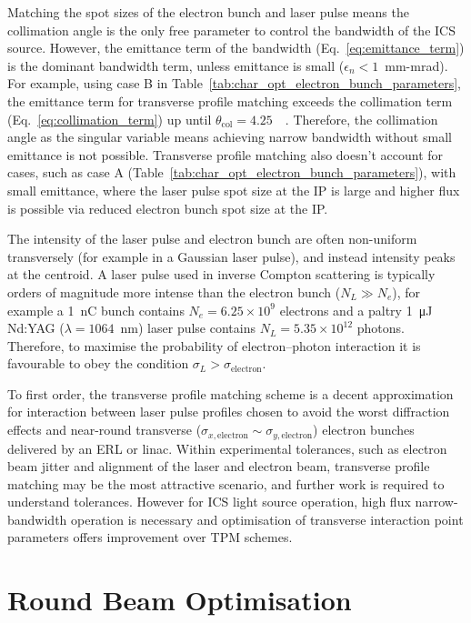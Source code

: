 \documentclass[../main.tex]{subfiles}
\begin{document}
Matching the spot sizes of the electron bunch and laser pulse means the collimation angle is the only free parameter to control the bandwidth of the ICS source. However, the emittance term of the bandwidth (Eq.~\ref{eq:emittance_term}) is the dominant bandwidth term, unless emittance is small ($\epsilon_{n} < 1$~\si{\milli\meter}-\si{\milli\radian}). For example, using case B in Table~\ref{tab:char_opt_electron_bunch_parameters}, the emittance term for transverse profile matching exceeds the collimation term (Eq.~\ref{eq:collimation_term}) up until $\theta_{\mathrm{col}} = 4.25$~\si{\milli\rad}. Therefore, the collimation angle as the singular variable means achieving narrow bandwidth without small emittance is not possible. Transverse profile matching also doesn't account for cases, such as case A (Table~\ref{tab:char_opt_electron_bunch_parameters}), with small emittance, where the laser pulse spot size at the IP is large and higher flux is possible via reduced electron bunch spot size at the IP. 

The intensity of the laser pulse and electron bunch are often non-uniform transversely (for example in a Gaussian laser pulse), and instead intensity peaks at the centroid. A laser pulse used in inverse Compton scattering is typically orders of magnitude more intense than the electron bunch ($N_{L} \gg N_{e}$), for example a 1~\si{\nano\coulomb} bunch contains $N_{e} = 6.25\times 10^{9}$ electrons and a paltry 1~\si{\micro\joule} Nd:YAG ($\lambda = 1064$~\si{\nano\meter}) laser pulse contains $N_{L} = 5.35\times 10^{12}$ photons. Therefore, to maximise the probability of electron--photon interaction it is favourable to obey the condition $\sigma_{L} > \sigma_{\mathrm{electron}}$.

To first order, the transverse profile matching scheme is a decent approximation for interaction between laser pulse profiles chosen to avoid the worst diffraction effects and near-round transverse  ($\sigma_{x,\mathrm{electron}}\sim\sigma_{y,\mathrm{electron}}$)  electron bunches delivered by an ERL or linac. Within experimental tolerances, such as electron beam jitter and alignment of the laser and electron beam, transverse profile matching may be the most attractive scenario, and further work is required to understand tolerances. However for ICS light source operation, high flux narrow-bandwidth operation is necessary and optimisation of transverse interaction point parameters offers improvement over TPM schemes. 

\section{Round Beam Optimisation}
\label{sec:RB_optimisation}
\end{document}
